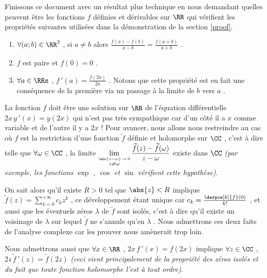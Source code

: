 Finissons ce document avec un résultat plus technique en nous demandant quelles peuvent être les fonctions $f$ définies et dérivables sur $\RR$ qui vérifient les propriétés suivantes utilisées dans la démonstration de la section \ref{proof}.
\begin{enumerate}
	\item $\forall (a ; b) \in \RR^2$ , si $a \neq b$ alors $\frac{f(a) - f(b)}{a - b} = \frac{f(a + b)}{a + b}$ .

	\item $f$ est paire et $f(0) = 0$ .

	\item $\forall a \in \RRs$ , $f\,'(a) = \frac{f(2 a)}{2 a}$ . Notons que cette propriété est en fait une conséquence de la première via un passage à la limite de $b$ vers $a$ .
\end{enumerate}


\medskip


La fonction $f$ doit être une solution sur $\RR$ de l'équation différentielle $2 x \, y\,'(x) = y(2x)$ qui n'est pas très sympathique car d'un côté il a $x$ comme variable et de l'autre il y a $2x$ !
Pour avancer, nous allons nous restreindre au cas où $f$ est la restriction d'une fonction $\widetilde{f}$ définie et holomorphe sur $\CC$ , c'est à dire telle que $\forall \omega \in \CC$ , la limite $\displaystyle \lim_{\stackrel{\abs{z - \omega} \, \rightarrow \, 0}{z \neq \omega}} \frac{\widetilde{f}(z) - \widetilde{f}(\omega)}{z - \omega}$ existe dans $\CC$
\emph{(par exemple, les fonctions $\exp$ , $\cos$ et $\sin$ vérifient cette hypothèse)}.


\medskip

On sait alors qu'il existe $R > 0$ tel que $\abs{z} < R$ implique
$\displaystyle \widetilde{f}(z) = \sum_{k = 0}^{+ \infty} c_k z^k$ , ce développement étant unique car $c_k = \frac{\derpow[k]{f}(0)}{k!}$ , et aussi que les éventuels zéros $\lambda$ de $\widetilde{f}$ sont isolés, c'est à dire qu'il existe un voisinage de $\lambda$ sur lequel $\widetilde{f}$ ne s'annule qu'en $\lambda$ . Nous admettrons ces deux faits de l'analyse complexe car les prouver nous amènerait trop loin.


\medskip

Nous admettrons aussi que $\forall x \in \RR$ , $2 x \, f\,'(x) = f(2x)$ implique $\forall z \in \CC$ , $2 z \, \widetilde{f}\,'(z) = \widetilde{f}(2z)$ \emph{(ceci vient principalement de la propriété des zéros isolés et du fait que toute fonction holomorphe l'est à tout ordre)}. 


